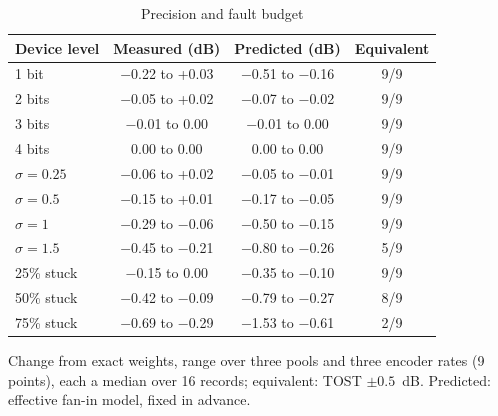\begin{table}[t]
\centering
\caption{Precision and fault budget}
\label{tab:devices}
\scriptsize
\setlength{\tabcolsep}{4pt}
\begin{tabular}{@{}lccc@{}}
\toprule
Device level & Measured (dB) & Predicted (dB) & Equivalent \\
\midrule
1 bit & $-$0.22 to +0.03 & $-$0.51 to $-$0.16 & 9/9 \\
2 bits & $-$0.05 to +0.02 & $-$0.07 to $-$0.02 & 9/9 \\
3 bits & $-$0.01 to 0.00 & $-$0.01 to 0.00 & 9/9 \\
4 bits & 0.00 to 0.00 & 0.00 to 0.00 & 9/9 \\
$\sigma = 0.25$ & $-$0.06 to +0.02 & $-$0.05 to $-$0.01 & 9/9 \\
$\sigma = 0.5$ & $-$0.15 to +0.01 & $-$0.17 to $-$0.05 & 9/9 \\
$\sigma = 1$ & $-$0.29 to $-$0.06 & $-$0.50 to $-$0.15 & 9/9 \\
$\sigma = 1.5$ & $-$0.45 to $-$0.21 & $-$0.80 to $-$0.26 & 5/9 \\
25\% stuck & $-$0.15 to 0.00 & $-$0.35 to $-$0.10 & 9/9 \\
50\% stuck & $-$0.42 to $-$0.09 & $-$0.79 to $-$0.27 & 8/9 \\
75\% stuck & $-$0.69 to $-$0.29 & $-$1.53 to $-$0.61 & 2/9 \\
\bottomrule
\end{tabular}

\vspace{2pt}
\parbox{\columnwidth}{\scriptsize Change from exact weights, range over three pools and three encoder rates (9 points), each a median over 16 records; equivalent: TOST $\pm0.5$~dB. Predicted: effective fan-in model, fixed in advance.}
\end{table}
